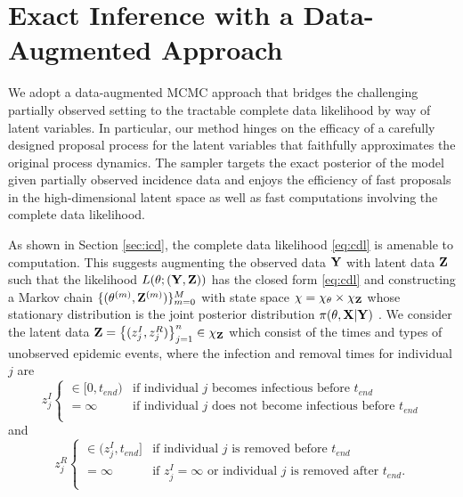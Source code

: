 \documentclass[11pt]{article}
\begin{document}
	
	\section{Exact Inference with a  Data-Augmented Approach}
	\label{sec:con}
	
	We adopt a data-augmented MCMC approach that bridges the challenging partially observed setting to the tractable complete data likelihood by way of latent variables. In particular, our method hinges on the efficacy of a carefully designed proposal process for the latent variables that faithfully approximates the original process dynamics. 
	The sampler targets the exact posterior of the model given partially observed incidence data and enjoys the efficiency of fast proposals in the high-dimensional latent space as well as fast computations involving the complete data likelihood.
	
	As shown in Section \ref{sec:icd}, the complete data likelihood \eqref{eq:cdl} is amenable to computation. This suggests augmenting the observed data $\mathbf{Y}$ with latent data $\mathbf{Z}$ such that the likelihood $L(\theta; (\mathbf{Y}, \mathbf{Z}))$ has the closed form \eqref{eq:cdl} and constructing a Markov chain $\{(\theta^{(m)}, \mathbf{Z}^{(m)})\}_{m=0}^M$ with state space $\chi = \chi_{\theta} \times \chi_{\mathbf{Z}}$ whose stationary distribution is the joint posterior distribution $\pi(\theta, \mathbf{X}|\mathbf{Y})$ \cite{Gibson.1998, ONeill.1999, Fintzi.2017}. We consider the latent data $\mathbf{Z} = \left\lbrace (z^I_j, z^R_j)\right\rbrace_{j=1}^{n} \in \chi_{\mathbf{Z}}$ which consist of the times and types of unobserved epidemic events, where the infection and removal times for individual $j$ are
	$$z^I_j \begin{cases}
		\in [0, t_{end}) & \text{if individual } j \text{ becomes infectious before } t_{end} \\
		= \infty & \text{if individual } j \text{ does not become infectious before } t_{end} \\
	\end{cases}$$
	and
	$$z^R_j \begin{cases}
		\in (z^I_j, t_{end}] & \text{if individual } j \text{ is removed before } t_{end} \\
		= \infty & \text{if } z^I_j = \infty \text{ or individual } j \text{ is removed after } t_{end}. \\
	\end{cases}$$
	
\end{document}
